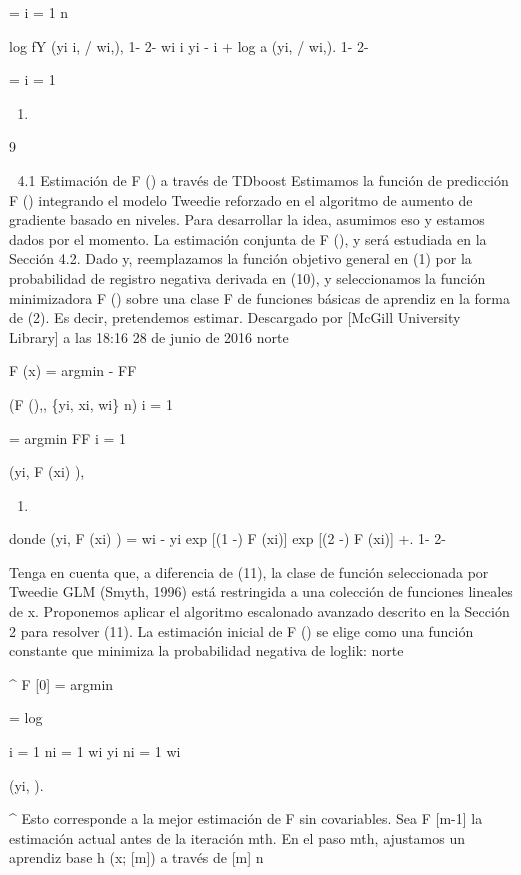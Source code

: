 \documentclass[]{article}
\begin{document}
= i = 1 n

log fY (yi \textbar{} i, / wi,), 1- 2- wi i yi - i + log a (yi, / wi,).
1- 2-

= i = 1

\begin{enumerate}
\def\labelenumi{(\arabic{enumi})}
\setcounter{enumi}{9}
\item
\end{enumerate}

9

 4.1 Estimación de F () a través de TDboost Estimamos la función de
predicción F () integrando el modelo Tweedie reforzado en el algoritmo
de aumento de gradiente basado en niveles. Para desarrollar la idea,
asumimos eso y estamos dados por el momento. La estimación conjunta de F
(), y será estudiada en la Sección 4.2. Dado y, reemplazamos la función
objetivo general en (1) por la probabilidad de registro negativa
derivada en (10), y seleccionamos la función minimizadora F () sobre una
clase F de funciones básicas de aprendiz en la forma de (2). Es decir,
pretendemos estimar. Descargado por {[}McGill University Library{]} a
las 18:16 28 de junio de 2016 norte

F (x) = argmin - FF

(F (),, \textbar{} \{yi, xi, wi\} n) i = 1

= argmin FF i = 1

(yi, F (xi) \textbar{}),

\begin{enumerate}
\def\labelenumi{(\arabic{enumi})}
\setcounter{enumi}{10}
\item
\end{enumerate}

donde (yi, F (xi) \textbar{}) = wi - yi exp {[}(1 -) F (xi){]} exp {[}(2
-) F (xi){]} +. 1- 2-

Tenga en cuenta que, a diferencia de (11), la clase de función
seleccionada por Tweedie GLM (Smyth, 1996) está restringida a una
colección de funciones lineales de x. Proponemos aplicar el algoritmo
escalonado avanzado descrito en la Sección 2 para resolver (11). La
estimación inicial de F () se elige como una función constante que
minimiza la probabilidad negativa de loglik: norte

\^{} F {[}0{]} = argmin

= log

i = 1 ni = 1 wi yi ni = 1 wi

(yi, \textbar{}).

\^{} Esto corresponde a la mejor estimación de F sin covariables. Sea F
{[}m-1{]} la estimación actual antes de la iteración mth. En el paso
mth, ajustamos un aprendiz base h (x; {[}m{]}) a través de {[}m{]} n
\end{document}
